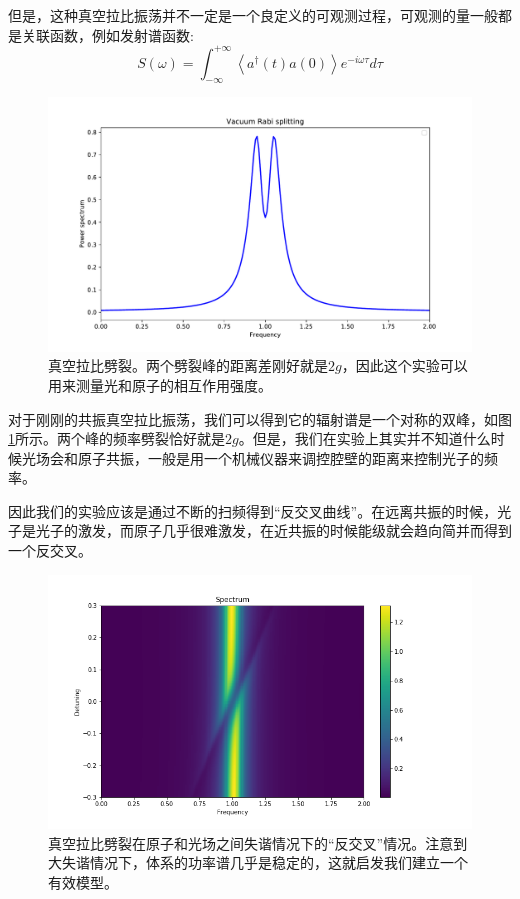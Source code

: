 \documentclass[supercite]{HustGraduPaper}
\newcommand{\avg}[1]{\left\langle #1 \right\rangle}
\begin{document}
	但是，这种真空拉比振荡并不一定是一个良定义的可观测过程，可观测的量一般都是关联函数，例如发射谱函数:
	\begin{equation}
	S(\omega) = \int_{-\infty}^{+\infty} \avg{a^\dagger(t) a(0)} e^{-i\omega \tau} d\tau
	\end{equation}
	
	\begin{figure}[h]
		\centering
		\includegraphics[width=0.9\linewidth]{Figures/mine/VacuumRabisp}
		\caption{真空拉比劈裂。两个劈裂峰的距离差刚好就是$2g$，因此这个实验可以用来测量光和原子的相互作用强度。}
		\label{fig:vacuumrabisp}
	\end{figure}
对于刚刚的共振真空拉比振荡，我们可以得到它的辐射谱是一个对称的双峰，如图\ref{fig:vacuumrabisp}所示。两个峰的频率劈裂恰好就是$2g$。但是，我们在实验上其实并不知道什么时候光场会和原子共振，一般是用一个机械仪器来调控腔壁的距离来控制光子的频率\cite{puri1987finite}。

因此我们的实验应该是通过不断的扫频得到“反交叉曲线”。在远离共振的时候，光子是光子的激发，而原子几乎很难激发，在近共振的时候能级就会趋向简并而得到一个反交叉。

\begin{figure}
	\centering
	\includegraphics[width=0.9\linewidth]{Figures/mine/VacuumRabsp2.png}
	\caption{真空拉比劈裂在原子和光场之间失谐情况下的“反交叉”情况。注意到大失谐情况下，体系的功率谱几乎是稳定的，这就启发我们建立一个有效模型。}
	\label{fig:vacuumrabsp2}
\end{figure}
\end{document}

